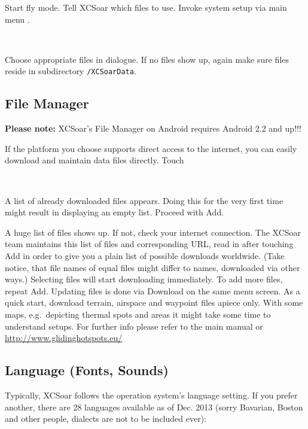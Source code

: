 \documentclass[english,a4paper,12pt]{refrep}
\renewcommand{\config}[3]{\bmenut{Config}{#1/3}{\LARGE$\triangleright$}~\bmenut{#2}{#3}}%
\begin{document}
Start fly mode. Tell XCSoar which files to use. Invoke system setup via main 
menu .

\begin{flushleft}\hspace*{1cm}\config{2}{System}{}\blink{}
\blink{}\\\end{flushleft}

Choose appropriate files in dialogue. If no files show up, again make sure files 
reside in subdirectory \texttt{/XCSoarData}.

\subsection{\textcolor{flashblue}{File Manager}}
\textbf{Please note:} XCSoar's File Manager on Android requires Android 2.2
and up!!!

If the platform you choose supports direct access to the internet, you can 
easily download and maintain data files directly. Touch 

\begin{flushleft}\hspace*{1cm}\config{2}{File}{Manager}\\\end{flushleft}
A list of already downloaded files appears.  Doing this for the very first 
time might result in displaying an empty list. Proceed with \blink Add.

A huge list of files shows up. If not, check your internet connection. The XCSoar
team maintains this list of files and corresponding URL, read in after
touching \blink Add in order to give you a plain list of possible downloads 
worldwide. (Take notice, that file names of equal files might differ to names, 
downloaded via other ways.)
Selecting files will start downloading immediately. To add more files, repeat 
\blink Add.
Updating files is done via \blink Download on the same menu screen.  As a 
quick start, download terrain, airspace and waypoint files apiece only. With 
some maps, e.g.\ depicting thermal spots and areas it might take some time to
understand setups. For further info please refer to the main manual or 
\url{http://www.glidinghotspots.eu/} 

\subsection{\textcolor{flashblue}{Language (Fonts, Sounds)}}
Typically, XCSoar follows the operation system's language setting. If you
prefer another, there are 28 languages available as of Dec. 2013 (sorry
Bavarian, Boston and other people, dialects are not to be included ever):
\end{document}
